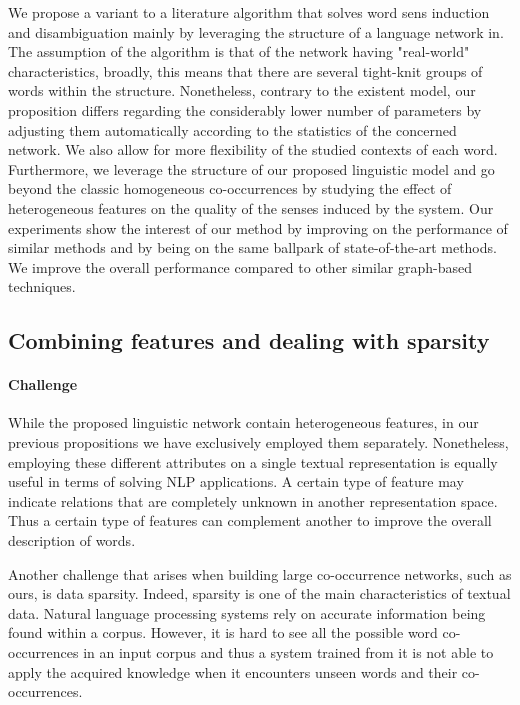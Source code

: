 We propose a variant to a literature algorithm that solves word sens induction and disambiguation mainly by leveraging  the structure of a language network in. The assumption of the algorithm is that of the network having "real-world" characteristics, broadly, this means that there are several tight-knit groups of words within the structure. Nonetheless, contrary to the existent model, our proposition differs regarding the considerably lower number of parameters by adjusting them automatically according to the statistics of the concerned network. We also allow for more flexibility of the studied contexts of each word. Furthermore, we leverage the structure of our proposed linguistic model and go beyond the classic homogeneous co-occurrences by studying the effect of heterogeneous features on the quality of the senses induced by the system. Our experiments show the interest of our method by improving on the performance of similar methods and by being on the same ballpark of state-of-the-art methods. 
 We  improve the overall performance compared to other similar graph-based techniques.

\subsection{Combining features and dealing with sparsity}
\paragraph{Challenge}

While the proposed linguistic network contain heterogeneous features, in our previous propositions we have exclusively employed them separately. Nonetheless, employing these different attributes on a single textual representation is equally useful in terms of solving NLP applications. A certain type of feature may indicate relations that are completely unknown in another representation space. Thus a certain type of features can complement another to improve the overall description of words.

Another challenge that arises when building large co-occurrence networks, such as ours, is data sparsity. Indeed, sparsity is one of the main characteristics of textual data. Natural language processing systems rely on accurate information being found within a corpus. However, it is hard to see all the possible word co-occurrences in an input corpus and thus a system trained from it is not able to apply the acquired knowledge when it encounters unseen words and their co-occurrences.


